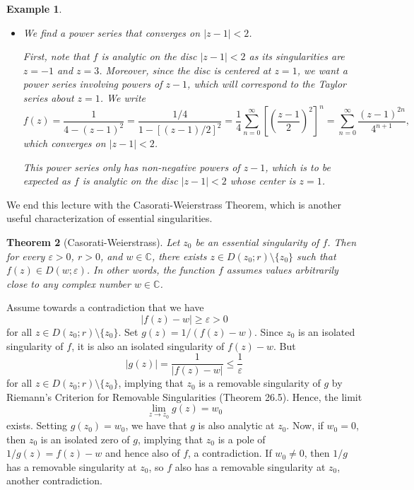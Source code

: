 \documentclass[10pt]{article}
\makeatletter
\newcommand{\eps}{\varepsilon}
\newcommand{\C}{\mathbb{C}}
\theoremstyle{newstyle}
\newtheorem{thm}{Theorem}[section]
\newtheorem{exmp}[thm]{Example}
\newenvironment{pf}[1][\proofname]{\par
  \pushQED{\qed}%
  \normalfont \topsep0\p@\relax
  \trivlist
  \item[\hskip\labelsep\scshape
  #1\@addpunct{.}]\ignorespaces
}{%
  \popQED\endtrivlist\@endpefalse
}
\makeatother
\begin{document}
\begin{exmp}
\begin{itemize}
    \item We find a power series that converges on $|z-1| < 2$. 
    
    First, note that $f$ is analytic on the disc $|z-1| < 2$ as its singularities are $z = -1$ 
    and $z = 3$. Moreover, since the disc is centered at $z = 1$, we want a power series 
    involving powers of $z - 1$, which will correspond to the Taylor series about $z = 1$. We write 
    \[ f(z) = \frac{1}{4-(z-1)^2} = \frac{1/4}{1-[(z-1)/2]^2} = \frac14 \sum_{n=0}^\infty 
    \left[ \left( \frac{z-1}2 \right)^2 \right]^n = \sum_{n=0}^\infty \frac{(z-1)^{2n}}{4^{n+1}}, \]
    which converges on $|z-1| < 2$. 
    
    This power series only has non-negative powers of $z-1$, which is to be expected as $f$ is 
    analytic on the disc $|z-1| < 2$ whose center is $z = 1$. 
\end{itemize}
\end{exmp}

We end this lecture 
with the Casorati-Weierstrass Theorem, which is another useful characterization of essential 
singularities. 

\begin{thm}[Casorati-Weierstrass]
Let $z_0$ be an essential singularity of $f$. Then for every $\eps > 0$, $r > 0$, and $w \in \C$, 
there exists $z \in D(z_0; r) \setminus \{z_0\}$ such that $f(z) \in D(w; \eps)$. 
In other words, the function $f$ assumes values arbitrarily close to any complex number $w \in \C$. 
\end{thm}
\begin{pf}
Assume towards a contradiction that we have 
\[ |f(z) - w| \geq \eps > 0 \] 
for all $z \in D(z_0; r) \setminus \{z_0\}$. Set $g(z) = 1/(f(z) - w)$. Since $z_0$ is an 
isolated singularity of $f$, it is also an isolated singularity of $f(z) - w$. But 
\[ |g(z)| = \frac{1}{|f(z) - w|} \leq \frac1{\eps} \] 
for all $z \in D(z_0; r) \setminus \{z_0\}$, implying that $z_0$ is a removable singularity of $g$
by Riemann's Criterion for Removable Singularities (Theorem 26.5). Hence, the limit 
\[ \lim_{z\to z_0} g(z) = w_0 \] 
exists. Setting $g(z_0) = w_0$, we have that $g$ is also analytic at $z_0$. Now, if $w_0 = 0$, 
then $z_0$ is an isolated zero of $g$, implying that $z_0$ is a pole of $1/g(z) = f(z) - w$ 
and hence also of $f$, a contradiction. If $w_0 \neq 0$, then $1/g$ has a removable 
singularity at $z_0$, so $f$ also has a removable singularity at $z_0$, another contradiction. 
\end{pf}
\end{document}
